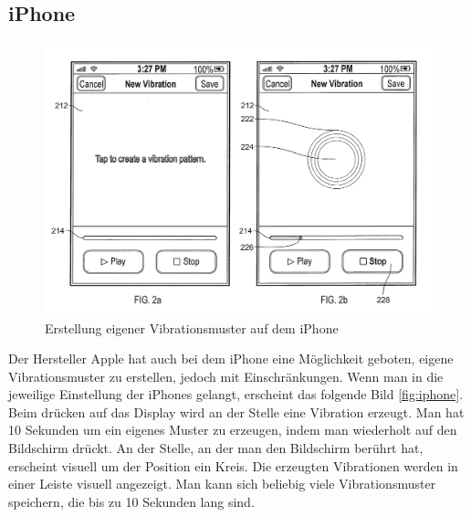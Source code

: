  
\subsection{iPhone}
\label{ch:Grundlagen:sec:RelatedWork:subsec:PersonalisierteVibration}

\begin{figure}
	\centering
    \includegraphics[width=\textwidth]{pics/iphone.png}
    \caption{Erstellung eigener Vibrationsmuster auf dem iPhone}
    \label{fig:iphone}
\end{figure}

Der Hersteller Apple hat auch bei dem iPhone eine M{\"o}glichkeit geboten, eigene Vibrationsmuster zu erstellen, jedoch mit Einschr{\"a}nkungen.
Wenn man in die jeweilige Einstellung der iPhones gelangt, erscheint das folgende Bild \autoref{fig:iphone}. 
Beim dr{\"u}cken auf das Display wird an der Stelle eine Vibration erzeugt. 
Man hat 10 Sekunden um ein eigenes Muster zu erzeugen, indem man wiederholt auf den Bildschirm dr{\"u}ckt. 
An der Stelle, an der man den Bildschirm ber{\"u}hrt hat, erscheint visuell um der Position ein Kreis. 
Die erzeugten Vibrationen werden in einer Leiste visuell angezeigt. 
Man kann sich beliebig viele Vibrationsmuster speichern, die bis zu 10 Sekunden lang sind. \cite{fleizach2016custom}

